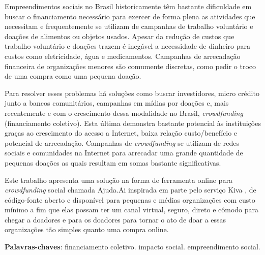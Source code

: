 \begin{resumo}
Empreendimentos sociais no Brasil historicamente têm bastante dificuldade em buscar o financiamento necessário para exercer de forma plena as atividades que necessitam e frequentemente se utilizam de campanhas de trabalho voluntário e doações de alimentos ou objetos usados. Apesar da redução de custos que trabalho voluntário e doações trazem é inegável a necessidade de dinheiro para custos como eletricidade, água e medicamentos. Campanhas de arrecadação financeira de organizações menores são comumente discretas, como pedir o troco de uma compra como uma pequena doação.

Para resolver esses problemas há soluções como buscar investidores, micro crédito junto a bancos comunitários, campanhas em mídias por doações e, mais recentemente e com o crescimento dessa modalidade no Brasil, \emph{crowdfunding} (financiamento coletivo). Esta última demonstra bastante potencial às instituições graças ao crescimento do acesso a Internet, baixa relação custo/benefício e potencial de arrecadação. Campanhas de \emph{crowdfunding} se utilizam de redes sociais e comunidades na Internet para arrecadar uma grande quantidade de pequenas doações as quais resultam em somas bastante significativas.

Este trabalho apresenta uma solução na forma de ferramenta online para \emph{crowdfunding} social chamada Ajuda.Ai inspirada em parte pelo serviço Kiva \cite{flannery2007kiva}, de código-fonte aberto e disponível para pequenas e médias organizações com custo mínimo a fim que elas possam ter um canal virtual, seguro, direto e cômodo para chegar a doadores e para os doadores para tornar o ato de doar a essas organizações tão simples quanto uma compra online.

\vspace{\onelineskip}
\noindent
\textbf{Palavras-chaves}: financiamento coletivo. impacto social. empreendimento social.
\end{resumo}

